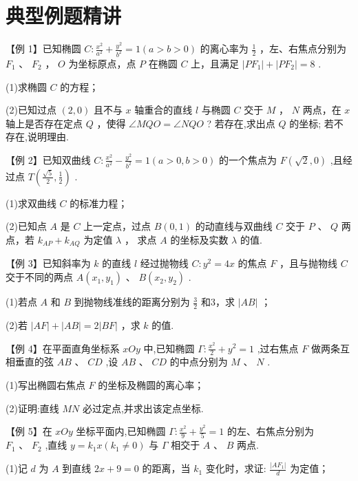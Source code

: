 \section*{典型例题精讲}

【例 1】已知椭圆 $C : \frac{{x}^{2}}{{a}^{2}} + \frac{{y}^{2}}{{b}^{2}} = 1\left( {a > b > 0}\right)$ 的离心率为 $\frac{1}{2}$ ，左、右焦点分别为 ${F}_{1}$ 、 ${F}_{2}$ ， $O$ 为坐标原点，点 $P$ 在椭圆 $C$ 上，且满足 $\left| {P{F}_{1}}\right|  + \left| {P{F}_{2}}\right|  = 8$ .

(1)求椭圆 $C$ 的方程；

(2)已知过点 $\left( {2,0}\right)$ 且不与 $x$ 轴重合的直线 $l$ 与椭圆 $C$ 交于 $M$ ， $N$ 两点，在 $x$ 轴上是否存在定点 $Q$ ，使得 $\angle {MQO} = \angle {NQO}$ ? 若存在,求出点 $Q$ 的坐标; 若不存在,说明理由.

【例 2】已知双曲线 $C : \frac{{x}^{2}}{{a}^{2}} - \frac{{y}^{2}}{{b}^{2}} = 1\left( {a > 0,b > 0}\right)$ 的一个焦点为 $F\left( {\sqrt{2},0}\right)$ ,且经过点 $T\left( {\frac{\sqrt{5}}{2},\frac{1}{2}}\right)$ .

(1)求双曲线 $C$ 的标准力程；

(2)已知点 $A$ 是 $C$ 上一定点，过点 $B\left( {0,1}\right)$ 的动直线与双曲线 $C$ 交于 $P$ 、 $Q$ 两点，若 ${k}_{AP} + {k}_{AQ}$ 为定值 $\lambda$ ， 求点 $A$ 的坐标及实数 $\lambda$ 的值.

【例 3】已知斜率为 $k$ 的直线 $l$ 经过抛物线 $C : {y}^{2} = {4x}$ 的焦点 $F$ ，且与抛物线 $C$ 交于不同的两点 $A\left( {{x}_{1},{y}_{1}}\right)$ 、 $B\left( {{x}_{2},{y}_{2}}\right)$ .

(1)若点 $A$ 和 $B$ 到抛物线准线的距离分别为 $\frac{3}{2}$ 和3，求 $\left| {AB}\right|$ ；

(2)若 $\left| {AF}\right|  + \left| {AB}\right|  = 2\left| {BF}\right|$ ，求 $k$ 的值.

【例 4】在平面直角坐标系 ${xOy}$ 中,已知椭圆 $\Gamma  : \frac{{x}^{2}}{2} + {y}^{2} = 1$ ,过右焦点 $F$ 做两条互相垂直的弦 ${AB}$ 、 ${CD}$ ,设 ${AB}\text{ 、 }{CD}$ 的中点分别为 $M\text{ 、 }N$ .

(1)写出椭圆右焦点 $F$ 的坐标及椭圆的离心率；

(2)证明:直线 ${MN}$ 必过定点,并求出该定点坐标.

【例 5】在 ${xOy}$ 坐标平面内,已知椭圆 $\Gamma  : \frac{{x}^{2}}{9} + \frac{{y}^{2}}{5} = 1$ 的左、右焦点分别为 ${F}_{1}\text{ 、 }{F}_{2}$ ,直线 $y = {k}_{1}x\left( {{k}_{1} \neq  0}\right)$ 与 $\Gamma$ 相交于 $A\text{ 、 }B$ 两点.

(1)记 $d$ 为 $A$ 到直线 ${2x} + 9 = 0$ 的距离，当 ${k}_{1}$ 变化时，求证: $\frac{\left| A{F}_{1}\right| }{d}$ 为定值；

